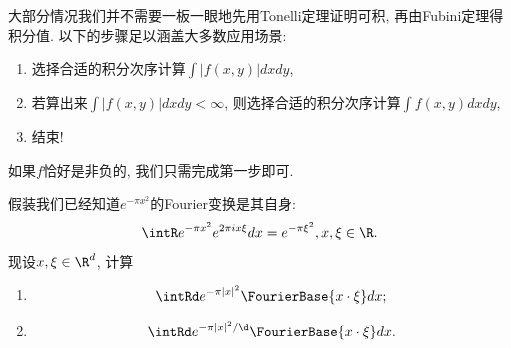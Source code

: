 \begin{remark}
    大部分情况我们并不需要一板一眼地先用Tonelli定理证明可积, 再由Fubini定理得积分值. 以下的步骤足以涵盖大多数应用场景:
    \begin{enumerate}
    \item 选择合适的积分次序计算$\int |f(x,y)|dxdy$,
    \item 若算出来$\int |f(x,y)|dxdy<\infty$, 则选择合适的积分次序计算$\int f(x,y)dxdy$,
    \item 结束!
    \end{enumerate}
    如果$f$恰好是非负的, 我们只需完成第一步即可.
\end{remark}

\begin{exercise}
    假装我们已经知道$e^{-\pi x^2}$的Fourier变换是其自身:
    $$\intR e^{-\pi x^2}e^{2\pi ix \xi}dx = e^{-\pi \xi^2}, x, \xi \in \R.$$
    现设$x, \xi \in \R^d$, 计算
    \begin{enumerate}
    \item $$\intRd e^{-\pi |x|^2}\FourierBase{x \cdot \xi}dx;$$
    \item $$\intRd e^{-\pi |x|^2 / \d}\FourierBase{x \cdot \xi}dx.$$
    \end{enumerate}
\end{exercise}

